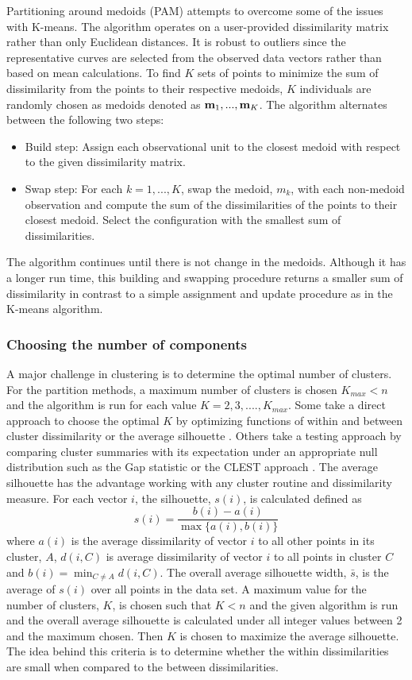 Partitioning around medoids (PAM) attempts to overcome some of the issues with K-means. The algorithm operates on a user-provided dissimilarity matrix rather than only Euclidean distances. It is robust to outliers since the representative curves are selected from the observed data vectors rather than based on mean calculations. To find $K$ sets of points to minimize the sum of dissimilarity from the points to their respective medoids, $K$ individuals are randomly chosen as medoids denoted as $\mathbf m_{1},...,\mathbf m_{K}$. The algorithm alternates between the following two steps:
 \begin{itemize}
\item Build step: Assign each observational unit to the closest medoid with respect to the given dissimilarity matrix.
\item Swap step: For each $k=1,...,K$, swap the medoid, $m_{k}$, with each non-medoid observation and compute the sum of the dissimilarities of the points to their closest medoid. Select the configuration with the smallest sum of dissimilarities.
\end{itemize}
The algorithm continues until there is not change in the medoids. Although it has a longer run time, this building and swapping procedure returns a smaller sum of dissimilarity in contrast to a simple assignment and update procedure as in the K-means algorithm. 

\subsubsection{Choosing the number of components}
A major challenge in clustering is to determine the optimal number of clusters. For the partition methods, a maximum number of clusters is chosen $K_{max}<n$ and the algorithm is run for each value $K=2,3,....,K_{max}$. Some take a direct approach to choose the optimal $K$  by optimizing functions of within and between cluster dissimilarity \cite{mulligan1985} or the average silhouette \cite{kaufman1990}. Others take a testing approach by comparing cluster summaries with its expectation under an appropriate null distribution such as the Gap statistic \cite{tibshirani2001} or the CLEST approach \cite{dudoit2002}. The average silhouette has the advantage working with any cluster routine and dissimilarity measure. For each vector $i$, the silhouette, $s(i)$, is calculated defined as
$$s(i)=\frac{b(i)-a(i)}{\max\{a(i),b(i)\}}$$
where $a(i)$ is the average dissimilarity of vector $i$ to all other points in its cluster, $A$, $d(i,C)$ is average dissimilarity of vector $i$ to all points in cluster $C$ and $b(i)=\min_{C\not= A} d(i,C)$. The overall average silhouette width, $\bar{s}$, is the average of $s(i)$ over all points in the data set. A maximum value for the number of clusters, $K$, is chosen such that $K<n$ and the given algorithm is run and the overall average silhouette is calculated under all integer values between 2 and the maximum chosen. Then $K$ is chosen to maximize the average silhouette. The idea behind this criteria is to determine whether the within dissimilarities are small when compared to the between dissimilarities. 

